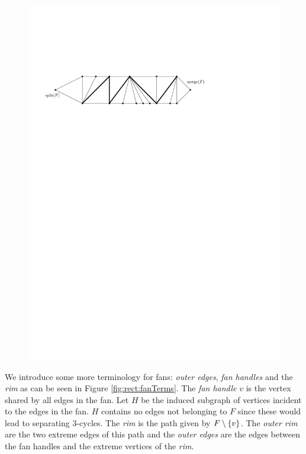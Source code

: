      \begin{figure}[h]
        \centering
        \includegraphics[scale=.9]{rectangularDuals/img/fans}
        \caption{}
        \label{fig:uni:fans}
      \end{figure}


     We introduce some more terminology for fans: \emph{outer edges}, \emph{fan handles} and the \emph{rim} as can be seen in Figure \ref{fig:rect:fanTerms}. The \emph{fan handle} $v$ is the vertex shared by all edges in the fan. Let $H$ be the induced subgraph of vertices incident to the edges in the fan. $H$ contains no edges not belonging to $F$ since these would lead to separating 3-cycles. The \emph{rim} is the path given by $F\setminus \left\lbrace {v} \right\rbrace$.
     The \emph{outer rim} are the two extreme edges of this path and the \emph{outer edges} are the edges between the fan handles and the extreme vertices of the \emph{rim}.

